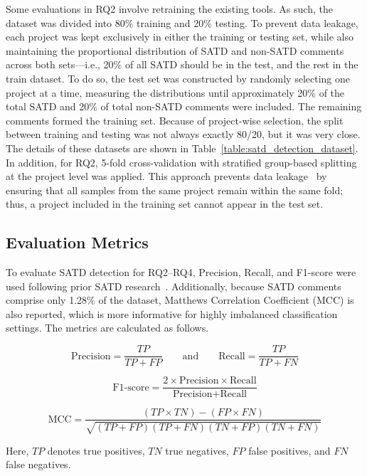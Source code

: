 Some evaluations in RQ2 involve retraining the existing tools. As such, the dataset was divided into 80\% training and 20\% testing. To prevent data leakage, each project was kept exclusively in either the training or testing set, while also maintaining the proportional distribution of SATD and non-SATD comments across both sets---i.e., 20\% of all SATD should be in the test, and the rest in the train dataset. To do so, the test set was constructed by randomly selecting one project at a time, measuring the distributions until approximately 20\% of the total SATD and 20\% of total non-SATD comments were included. The remaining comments formed the training set. Because of project-wise selection, the split between training and testing was not always exactly 80/20, but it was very close. The details of these datasets are shown in Table~\ref{table:satd_detection_dataset}. In addition, for RQ2, 5-fold cross-validation with stratified group-based splitting at the project level was applied. This approach prevents data leakage~\cite{chowdhury_method-level_2024, pascarella_performance_2020} by ensuring that all samples from the same project remain within the same fold; thus, a project included in the training set cannot appear in the test set.





\subsection{Evaluation Metrics}

To evaluate SATD detection for RQ2–RQ4, Precision, Recall, and F1-score were used following prior SATD research~\cite{sheikhaei_understanding_2025, maldonado_using_2017, ren_neural_2019, guo_how_2021, gu_self-admitted_2024}. Additionally, because SATD comments comprise only 1.28\% of the dataset, Matthews Correlation Coefficient (MCC) is also reported, which is more informative for highly imbalanced classification settings. The metrics are calculated as follows.

\[
\text{Precision} = \frac{TP}{TP + FP}
\qquad \text{and} \qquad
\text{Recall} = \frac{TP}{TP + FN}
\]

\[
\text{F1-score} = \frac{2 \times \text{Precision} \times \text{Recall}}{\text{Precision} + \text{Recall}}
\]


\[
\text{MCC} = \frac{(TP \times TN) - (FP \times FN)}{\sqrt{(TP + FP)(TP + FN)(TN + FP)(TN + FN)}}
\]


Here, \( TP \) denotes true positives, \( TN \) true negatives, \( FP \) false positives, and \( FN \) false negatives.


